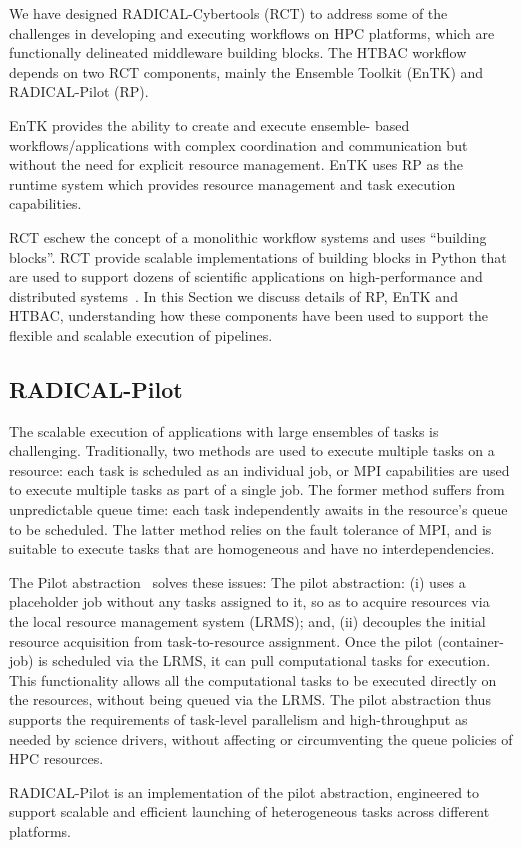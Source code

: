 We have designed RADICAL-Cybertools (RCT) to address some of the challenges
in developing and executing workflows on HPC platforms, which are
functionally delineated middleware building blocks. The HTBAC workflow
 depends on two RCT components, mainly the
Ensemble Toolkit (EnTK) and RADICAL-Pilot (RP).

EnTK provides the ability to create and execute ensemble- based
workflows/applications with complex coordination and communication but
without the need for explicit resource management. EnTK uses RP as the
runtime system which provides resource management and task execution
capabilities.

RCT eschew the concept of a monolithic workflow systems and uses ``building
blocks''. RCT provide scalable implementations of building blocks in Python
that are used to support dozens of scientific applications on
high-performance and distributed systems~\cite{turilli2016analysis,angius2017converging,treikalis2016repex, balasubramanian2016ensemble,balasubramanian2016extasy}. In this Section we discuss details of RP, EnTK
and HTBAC, understanding how these components have been used to support the
flexible and scalable execution of pipelines.

\subsection{RADICAL-Pilot}

The scalable execution of applications with large ensembles of tasks is
challenging. Traditionally, two methods are used to execute multiple tasks on
a resource: each task is scheduled as an individual job, or MPI capabilities
are used to execute multiple tasks as part of a single job. The former method
suffers from unpredictable queue time: each task independently awaits in the
resource's queue to be scheduled. The latter method relies on the fault
tolerance of MPI, and is suitable to execute tasks that are homogeneous and
have no interdependencies.

The Pilot abstraction~\cite{turilli2017comprehensive} solves these issues:
The pilot abstraction: (i) uses a placeholder job without any tasks assigned
to it, so as to acquire resources via the local resource management system
(LRMS); and, (ii) decouples the initial resource acquisition from
task-to-resource assignment. Once the pilot (container-job) is scheduled via
the LRMS, it can pull computational tasks for execution. This functionality
allows all the computational tasks to be executed directly on the resources,
without being queued via the LRMS\@. %
The pilot abstraction thus supports the requirements of task-level
parallelism and high-throughput as needed by science drivers, without
affecting or circumventing the queue policies of HPC resources.

RADICAL-Pilot is an implementation of the pilot abstraction, engineered to
support scalable and efficient launching of heterogeneous tasks across
different platforms.